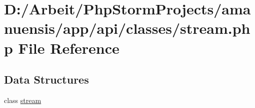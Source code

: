 \hypertarget{a00075}{}\section{D\+:/\+Arbeit/\+Php\+Storm\+Projects/amanuensis/app/api/classes/stream.php File Reference}
\label{a00075}
\subsection*{Data Structures}
\begin{DoxyCompactItemize}
\item 
class \hyperlink{a00045}{stream}
\end{DoxyCompactItemize}
